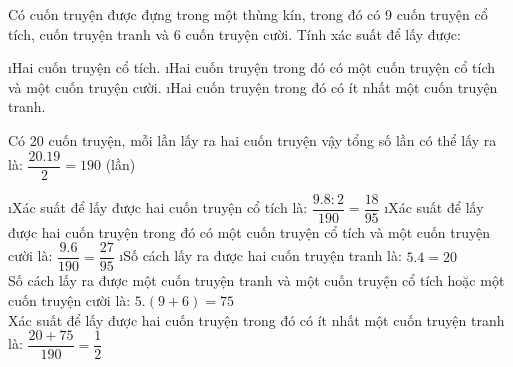 \begin{bt}
	Có cuốn truyện được đựng trong một thùng kín, trong đó có 9 cuốn truyện cổ tích, cuốn truyện tranh và 6 cuốn truyện cười. Tính xác suất để lấy được:
	\begin{enumerate}[a),leftmargin=*]
		\i Hai cuốn truyện cổ tích.
		\i Hai cuốn truyện trong đó có một cuốn truyện cổ tích và một cuốn truyện cười.
		\i Hai cuốn truyện trong đó có ít nhất một cuốn truyện tranh.
	\end{enumerate}
	\begin{loigiaichuong41}
		Có 20 cuốn truyện, mỗi lần lấy ra hai cuốn truyện vậy tổng số lần có thể lấy ra là:  $\dfrac{20.19}{2}= 190$ (lần)
		\begin{enumerate}[a),leftmargin=*]
			\i Xác suất để lấy được hai cuốn truyện cổ tích là: $\dfrac{{9.8:2}}{{190}} = \dfrac{{18}}{{95}}$  
			\i Xác suất để lấy được hai cuốn truyện trong đó có một cuốn truyện cổ tích và một cuốn truyện cười là:  $\dfrac{{9.6}}{{190}} = \dfrac{{27}}{{95}}$
			\i Số cách lấy ra được hai cuốn truyện tranh là:  $5.4 = 20$\\
			Số cách lấy ra được một cuốn truyện tranh và một cuốn truyện cổ tích hoặc một cuốn truyện cười là:  $5.\left( {9 + 6} \right) = 75$\\
			Xác suất để lấy được hai cuốn truyện trong đó có ít nhất một cuốn truyện tranh là:  $\dfrac{{20 + 75}}{{190}} = \dfrac{1}{2}$
		\end{enumerate}
	\end{loigiaichuong41}
\end{bt}
